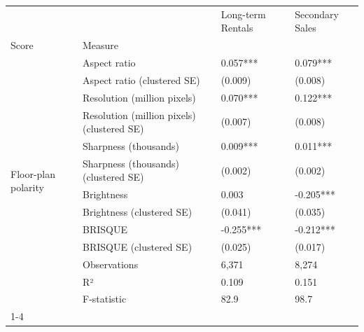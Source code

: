 \begin{tabular}{llll}
\toprule
 &  & Long-term Rentals & Secondary Sales \\
Score & Measure &  &  \\
\midrule
\multirow[t]{13}{*}{Floor-plan polarity} & Aspect ratio & 0.057*** & 0.079*** \\
 & Aspect ratio (clustered SE) & (0.009) & (0.008) \\
 & Resolution (million pixels) & 0.070*** & 0.122*** \\
 & Resolution (million pixels) (clustered SE) & (0.007) & (0.008) \\
 & Sharpness (thousands) & 0.009*** & 0.011*** \\
 & Sharpness (thousands) (clustered SE) & (0.002) & (0.002) \\
 & Brightness & 0.003 & -0.205*** \\
 & Brightness (clustered SE) & (0.041) & (0.035) \\
 & BRISQUE & -0.255*** & -0.212*** \\
 & BRISQUE (clustered SE) & (0.025) & (0.017) \\
 & Observations & 6,371 & 8,274 \\
 & R² & 0.109 & 0.151 \\
 & F-statistic & 82.9 & 98.7 \\
\cline{1-4}
\bottomrule
\end{tabular}
